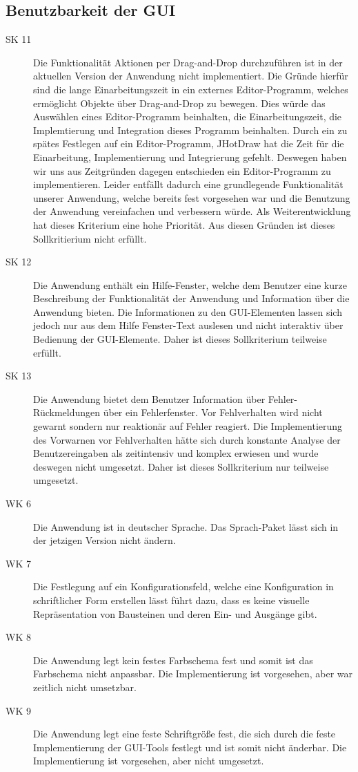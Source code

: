 \documentclass[parskip=full]{scrartcl}
\begin{document}
\subsection {Benutzbarkeit der GUI}




\begin{description}
\item[SK 11] Die Funktionalität Aktionen per Drag-and-Drop durchzuführen ist in der aktuellen Version der Anwendung nicht implementiert. Die Gründe hierfür sind die lange Einarbeitungszeit in ein externes Editor-Programm, welches ermöglicht Objekte über Drag-and-Drop zu bewegen. Dies würde das Auswählen eines Editor-Programm beinhalten, die Einarbeitungszeit, die Implemtierung und Integration dieses Programm beinhalten. Durch ein zu spätes Festlegen auf ein Editor-Programm, \gls{JHotDraw} hat die Zeit für die Einarbeitung, Implementierung und Integrierung gefehlt. Deswegen haben wir uns aus Zeitgründen dagegen entschieden ein Editor-Programm zu implementieren. Leider entfällt dadurch eine grundlegende Funktionalität unserer Anwendung, welche bereits fest vorgesehen war und die Benutzung der Anwendung vereinfachen und verbessern würde. Als Weiterentwicklung hat dieses Kriterium eine hohe Priorität. Aus diesen Gründen ist dieses Sollkritierium nicht erfüllt.
\item[SK 12] Die Anwendung enthält ein Hilfe-Fenster, welche dem Benutzer eine kurze Beschreibung der Funktionalität der Anwendung und Information über die Anwendung bieten. Die Informationen zu den GUI-Elementen lassen sich jedoch nur aus dem Hilfe Fenster-Text auslesen und nicht interaktiv über Bedienung der GUI-Elemente. Daher ist dieses Sollkriterium teilweise erfüllt.
\item[SK 13] Die Anwendung bietet dem Benutzer Information über Fehler-Rückmeldungen über ein Fehlerfenster. 
Vor Fehlverhalten wird nicht gewarnt sondern nur reaktionär auf Fehler reagiert. Die Implementierung des Vorwarnen vor Fehlverhalten hätte sich durch konstante Analyse der Benutzereingaben als zeitintensiv und komplex erwiesen und wurde deswegen nicht umgesetzt. Daher ist dieses Sollkriterium nur teilweise umgesetzt.
\item[WK 6] Die Anwendung ist in deutscher Sprache. Das Sprach-Paket lässt sich in der jetzigen Version nicht ändern.
\item[WK 7] Die Festlegung auf ein Konfigurationsfeld, welche eine Konfiguration in schriftlicher Form erstellen lässt führt dazu, dass es keine visuelle Repräsentation von Bausteinen und deren Ein- und Ausgänge gibt.
\item[WK 8] Die Anwendung legt kein festes Farbschema fest und somit ist das Farbschema nicht anpassbar. Die Implementierung ist vorgesehen, aber war zeitlich nicht umsetzbar.
\item[WK 9] Die Anwendung legt eine feste Schriftgröße fest, die sich durch die feste Implementierung der GUI-Tools festlegt und ist somit nicht änderbar. Die Implementierung ist vorgesehen, aber nicht umgesetzt.
\end{description}
\end{document}
